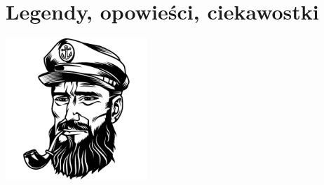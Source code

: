 \documentclass[11pt, twoside]{book}
\let\clearpage\relax
\begin{document}
\chapter{Legendy, opowieści, ciekawostki}
\begin{center}
    \includegraphics[width=0.4\textwidth]{images/bosman.png}
\end{center}
\pagestyle{legendy}


\clearpage{\mbox{}\pagestyle{empty}\cleardoublepage}
\end{document}
